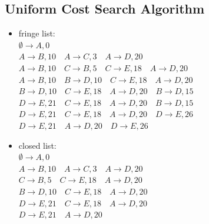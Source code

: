 \documentclass[aps,letterpaper,10pt]{revtex4}
\begin{document}
\subsection{Uniform Cost Search Algorithm}
\begin{itemize}
\item fringe list:\\
$\emptyset \to A,0$	\\
$A \to B,10 \quad A \to C,3 \quad A \to D,20$\\
$A \to B,10 \quad C \to B, 5 \quad C \to E,18 \quad A \to D,20$\\
$A \to B,10 \quad B \to D,10 \quad C \to E,18 \quad A \to D,20$\\
$B \to D,10 \quad C \to E,18 \quad A \to D,20 \quad B\to D,15$\\
$D \to E,21 \quad C \to E,18 \quad A \to D,20 \quad B\to D,15$\\
$D \to E,21 \quad C \to E,18 \quad A \to D,20 \quad D \to E,26$\\
$D \to E,21 \quad A \to D,20 \quad D \to E,26$
\item closed list:\\
$\emptyset \to A,0$	\\
$A \to B,10 \quad A \to C,3 \quad A \to D,20$\\
$C \to B, 5 \quad C \to E,18 \quad A \to D,20$\\
$B \to D,10 \quad C \to E,18 \quad A \to D,20$\\
$D \to E,21 \quad C \to E,18 \quad A \to D,20$\\
$D \to E,21 \quad A \to D,20$
\end{itemize}
\end{document}
